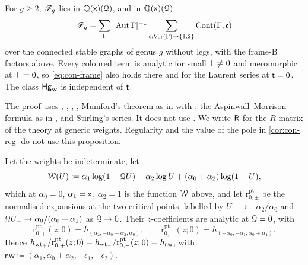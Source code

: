 \begin{prop}
\label{prop:con-frame}
For $g\geq 2$, $\mathscr{F}_g$ lies in $\mathbb{Q}(\mathsf{x})(\mathcal{Q})$, and in $\mathbb{Q}(\mathsf{x})(\mathcal{Q})$
\begin{equation}
\label{eq:con-frame}
\mathscr{F}_g=\sum_\Gamma|\operatorname{Aut}\Gamma|^{-1}\sum_{\mathfrak{c}:\mathrm{Ver}(\Gamma)\to\{1,2\}}\mathrm{Cont}(\Gamma,\mathfrak{c})
\end{equation}
over the connected stable graphs of genus $g$ without legs, with the frame-B factors above. Every coloured term is analytic for small $\mathsf{T}\neq 0$ and meromorphic at $\mathsf{T}=0$, so \cref{eq:con-frame} also holds there and for the Laurent series at $\mathsf{t}=0$. The class $\mathsf{Hg}_{\mathbf{w}}$ is independent of $\mathsf{t}$.
\end{prop}

The proof uses \cite[Theorem~(2), Prop.~8.7(ii), 2.17--2.19, (2.15)]{Tel12}, \cite{GP99}, \cite[App.~1]{CG07}, \cite[Defs.~2.2, 2.13, Prop.~2.14]{PPZ15}, Mumford's theorem as in \cite{FP00} with \cite[Theorem~4]{FP00}, the Aspinwall--Morrison formula as in \cite[p.~3]{FP00}, and Stirling's series. It does not use \cite[Theorem~31]{CCIT15}. We write $\mathsf{R}$ for the $R$-matrix of the theory at generic weights. Regularity and the value of the pole in \cref{cor:con-reg} do not use this proposition.

\begin{lem}
\label{lem:con-norm}
Let the weights be indeterminate, let
\[
\mathcal{W}(U)\coloneqq\alpha_1\log(1-\mathcal{Q} U)-\alpha_2\log U+(\alpha_0+\alpha_2)\log(1-U),
\]
which at $\alpha_0=0$, $\alpha_1=\mathsf{x}$, $\alpha_2=1$ is the function $\mathcal{W}$ above, and let $\mathrm{r}^{\mathrm{pt}}_{0,\pm}$ be the normalised expansions at the two critical points, labelled by $U_+\to-\alpha_2/\alpha_0$ and $\mathcal{Q} U_-\to\alpha_0/(\alpha_0+\alpha_1)$ as $\mathcal{Q}\to 0$. Their $z$-coefficients are analytic at $\mathcal{Q}=0$, with
\[
\mathrm{r}^{\mathrm{pt}}_{0,+}(z;0)=h_{(\alpha_2,-\alpha_0-\alpha_2,\alpha_0)},\qquad
\mathrm{r}^{\mathrm{pt}}_{0,-}(z;0)=h_{(-\alpha_0,-\alpha_1,\alpha_0+\alpha_1)}.
\]
Hence $h_{\mathrm{wt}_+}/\mathrm{r}^{\mathrm{pt}}_{0,+}(z;0)=h_{\mathrm{wt}_-}/\mathrm{r}^{\mathrm{pt}}_{0,-}(z;0)=h_{\mathsf{nw}}$, with $\mathsf{nw}\coloneqq(\alpha_1,\alpha_0+\alpha_2,-\epsilon_1,-\epsilon_2)$.
\end{lem}



